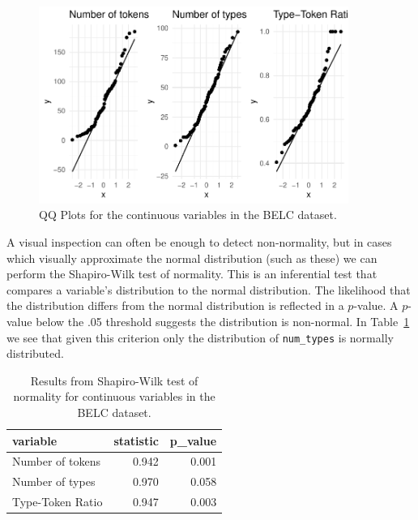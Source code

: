 \documentclass[
  letterpaper,
]{latex/krantz}
\begin{document}
\begin{figure}

{\centering \includegraphics[width=0.9\textwidth,height=\textheight]{./approaching-analysis_files/figure-pdf/fig-summaries-qqnorm-plot-belc-1.pdf}

}

\caption{\label{fig-summaries-qqnorm-plot-belc}QQ Plots for the
continuous variables in the BELC dataset.}

\end{figure}

A visual inspection can often be enough to detect non-normality, but in
cases which visually approximate the normal distribution (such as these)
we can perform the Shapiro-Wilk test of normality. This is an
inferential test that compares a variable's distribution to the normal
distribution. The likelihood that the distribution differs from the
normal distribution is reflected in a \(p\)-value. A \(p\)-value below
the .05 threshold suggests the distribution is non-normal. In
Table~\ref{tbl-summaries-normality-test-belc} we see that given this
criterion only the distribution of \texttt{num\_types} is normally
distributed.

\hypertarget{tbl-summaries-normality-test-belc}{}
\begin{table}
\caption{\label{tbl-summaries-normality-test-belc}Results from Shapiro-Wilk test of normality for continuous variables in
the BELC dataset. }\tabularnewline

\centering
\begin{tabular}{lrr}
\toprule
variable & statistic & p\_value\\
\midrule
Number of tokens & 0.942 & 0.001\\
Number of types & 0.970 & 0.058\\
Type-Token Ratio & 0.947 & 0.003\\
\bottomrule
\end{tabular}
\end{table}
\end{document}
